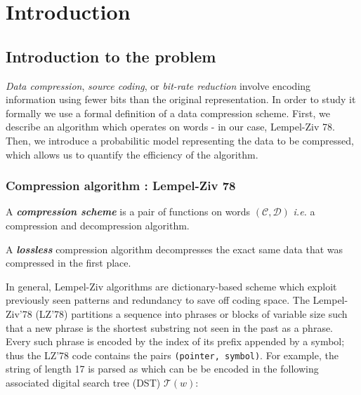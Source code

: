 \section{Introduction }



\subsection{Introduction to the problem }


\emph{Data compression}, \emph{source coding}, or 
\emph{bit-rate reduction} involve encoding 
information using fewer bits than the original
representation.
In order to study it formally we use a formal 
definition of a data compression scheme. 
First, we describe an algorithm which operates on words - 
in our case, Lempel-Ziv 78.
Then, we introduce a probabilitic model representing
the data to be compressed, which allows us to quantify
the efficiency of the algorithm.


\subsubsection{Compression algorithm : Lempel-Ziv 78 }

\begin{definition}
    A \emph{\bfseries compression scheme} is a pair of functions on
    words $(\mathcal{C}, \mathcal{D})$ \textit{i.e.} a compression 
    and decompression algorithm.
\end{definition}

\begin{definition}
    \label{def:lossless}
    A \emph{\bfseries lossless} compression algorithm decompresses 
    the exact same data that was compressed in the first place.
\end{definition}


\noindent
In general, Lempel-Ziv algorithms are dictionary-based scheme
which exploit previously seen patterns and redundancy to 
save off coding space. 
The Lempel-Ziv'78 (LZ'78) partitions a sequence into 
phrases or blocks of variable size such that a new phrase
is the shortest substring not seen in the past as a phrase. 
Every such phrase is encoded by the index of its prefix 
appended by a symbol; thus the LZ'78 code contains the 
pairs \verb|(pointer, symbol)|.
For example, the string 
\noindent of length 17 is parsed
as 
\noindent
which can be be 
encoded in the following associated digital search tree (DST) $\mathcal{T}(w)$:

